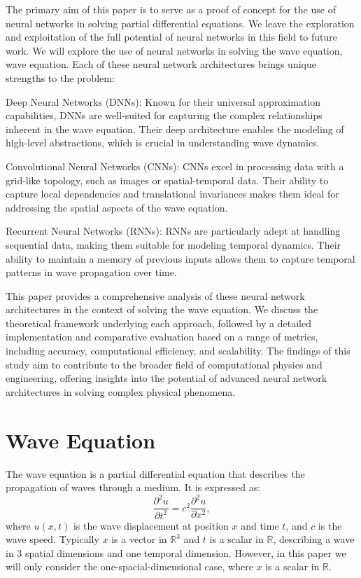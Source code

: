 \documentclass[twoside,11pt]{report}
\begin{document}
    The primary aim of this paper is to serve as a proof of concept for the use of neural networks in solving
    partial differential equations. We leave the exploration and exploitation of the full potential of neural
    networks in this field to future work. We will explore the use of neural networks in solving the wave equation,
    wave equation. Each of these neural network architectures brings unique strengths to the problem:

        Deep Neural Networks (DNNs): Known for their universal approximation capabilities, DNNs are well-suited for 
        capturing the complex relationships inherent in the wave equation. Their deep architecture enables the modeling 
        of high-level abstractions, which is crucial in understanding wave dynamics.

        Convolutional Neural Networks (CNNs): CNNs excel in processing data with a grid-like topology, such as images 
        or spatial-temporal data. Their ability to capture local dependencies and translational invariances makes them 
        ideal for addressing the spatial aspects of the wave equation.

        Recurrent Neural Networks (RNNs): RNNs are particularly adept at handling sequential data, making them suitable 
        for modeling temporal dynamics. Their ability to maintain a memory of previous inputs allows them to capture 
        temporal patterns in wave propagation over time.

    This paper provides a comprehensive analysis of these neural network architectures in the context of 
    solving the wave equation. We discuss the theoretical framework underlying each approach, followed by a 
    detailed implementation and comparative evaluation based on a range of metrics, including accuracy, 
    computational efficiency, and scalability. The findings of this study aim to contribute to the broader 
    field of computational physics and engineering, offering insights into the potential of advanced neural 
    network architectures in solving complex physical phenomena.

\section{Wave Equation}
\label{sec:wave}
    
    The wave equation is a partial differential equation that describes the propagation of waves through a medium.
    It is expressed as:
    \begin{equation}
    \frac{\partial^2 u}{\partial t^2} = c^2 \frac{\partial^2 u}{\partial x^2},
    \end{equation}
    where $u(x,t)$ is the wave displacement at position $x$ and time $t$, and $c$ is the wave speed.
    Typically $x$ is a vector in $\mathbb{R}^3$ and $t$ is a scalar in $\mathbb{R}$, describing a wave in
    3 spatial dimensions and one temporal dimension. However, in this paper we will only consider the
    one-spacial-dimensional case, where $x$ is a scalar in $\mathbb{R}$.
    
\end{document}
